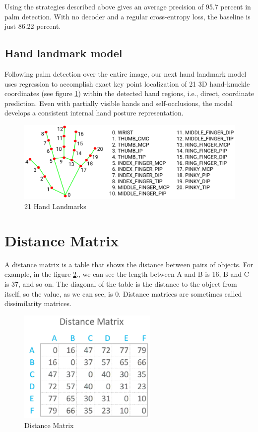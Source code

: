 Using the strategies described above gives an average precision of 95.7 percent in palm detection. With no decoder and a regular cross-entropy loss, the baseline is just 86.22 percent.

\subsection{Hand landmark model}
Following palm detection over the entire image, our next hand landmark model uses regression to accomplish exact key point localization of 21 3D hand-knuckle coordinates (see figure \ref{fig:Chap3-HandLandMark}) within the detected hand regions, i.e., direct, coordinate prediction. Even with partially visible hands and self-occlusions, the model develops a consistent internal hand posture representation.
\begin{figure}[H]
	\centering
	\includegraphics[width=\textwidth]{img/Chap3/HandLandMark}
	\caption{ 21 Hand Landmarks }
	\label{fig:Chap3-HandLandMark}
\end{figure}


\section{Distance Matrix}

A distance matrix \cite{DistanceMatrix} is a table that shows the distance between pairs of objects. For example, in the figure \ref{fig:Chap3-DM}., we can see the length between A and B is 16, B and C is 37, and so on. The diagonal of the table is the distance to the object from itself, so the value, as we can see, is 0. Distance matrices are sometimes called dissimilarity matrices.

\begin{figure}[H]
	\centering
	\includegraphics[width=0.6\textwidth]{img/Chap3/DM}
	\caption{ Distance Matrix }
	\label{fig:Chap3-DM}
\end{figure}

